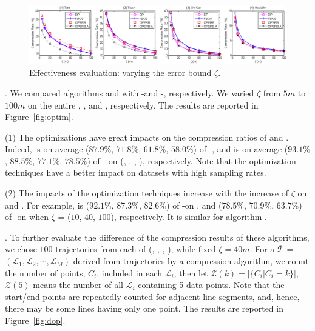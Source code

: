 \begin{figure}[tb!]
\centering
\includegraphics[scale=0.465]{figures/exp-CompressionRatio.png}
\vspace{-2.5ex}
\caption{\small Effectiveness evaluation: varying the error bound $\zeta$.}
\label{fig:cr}
\vspace{-.5ex}
\end{figure}





.
We compared algorithms \operb and \operba with -\operb and -\operba, respectively.
We varied $\zeta$ from $5m$ to $100m$ on the entire \taxi, \truck, \sercar and \geolife, respectively.
The results are reported in Figure~\ref{fig:optim}.

\sstab(1) The optimizations have great impacts on the compression ratios of \operb and \operba. Indeed,
\operb is  on average {($87.9\%$, ${71.8\%}$, $61.8\%$, $58.0\%$)} of -\operb, and \operba is  on average {($93.1\%$, ${88.5\%}$, $77.1\%$, $78.5\%$)} of -\operba
on (\taxi, \truck, \sercar, \geolife), respectively. Note that the optimization techniques  have a better impact on datasets with high sampling rates.

\sstab(2) The impacts of the optimization techniques increase with the increase of $\zeta$ on \taxi and \truck.
For example, \operb is {($92.1\%$, ${87.3\%}$, $82.6\%$)} of -\operb on \taxi, and {($78.5\%$, $70.9\%$, $63.7\%$)} of -\operb on \truck
when $\zeta$ = ($10$, $40$, $100$), respectively. It is similar for algorithm \operba.


.
To further evaluate the difference of the compression results of these algorithms, we chose $100$ trajectories from each of (\taxi, \truck, \sercar, \geolife),
while fixed $\zeta=40m$.
For a $\overline{\mathcal{T}}$ = $(\mathcal{L}_1, \mathcal{L}_2, \cdots , \mathcal{L}_M)$ derived
from trajectories by a compression algorithm, we count the number of points, $C_i$, included in each $\mathcal{L}_i$,
then let $\mathcal{Z}(k) = |\{ C_i | C_i =k\}|$, \ie $\mathcal{Z}(5)$ means the number of all $\mathcal{L}_i$ containing 5 data points.
Note that the start/end points are repeatedly counted for adjacent line segments, and, hence, there may be some lines having only one point.
The results are reported in Figure~\ref{fig:dop}.

